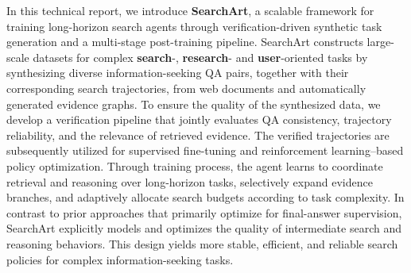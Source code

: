 \documentclass{huawei}
\begin{document}
In this technical report, we introduce \textbf{SearchArt}, a scalable framework for training long-horizon search agents through verification-driven synthetic task generation and a multi-stage post-training pipeline.
SearchArt constructs large-scale datasets for complex \textbf{search}-, \textbf{research}- and \textbf{user}-oriented tasks by synthesizing diverse information-seeking QA pairs, together with their corresponding search trajectories, from web documents and automatically generated evidence graphs.
To ensure the quality of the synthesized data, we develop a verification pipeline that jointly evaluates QA consistency, trajectory reliability, and the relevance of retrieved evidence. The verified trajectories are subsequently utilized for supervised fine-tuning and reinforcement learning–based policy optimization.
Through training process, the agent learns to coordinate retrieval and reasoning over long-horizon tasks, selectively expand evidence branches, and adaptively allocate search budgets according to task complexity. 
In contrast to prior approaches that primarily optimize for final-answer supervision, SearchArt explicitly models and optimizes the quality of intermediate search and reasoning behaviors. This design yields more stable, efficient, and reliable search policies for complex information-seeking tasks.
\end{document}
